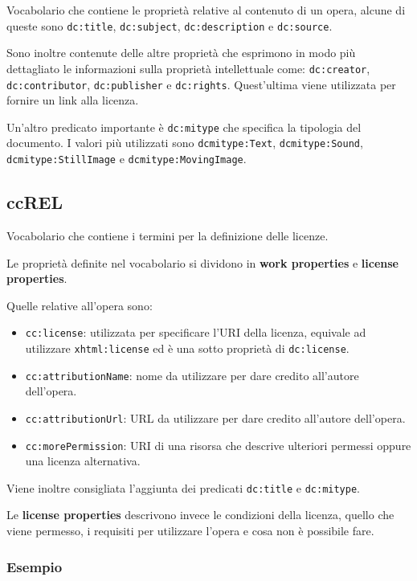 Vocabolario che contiene le proprietà relative al contenuto di un opera, alcune di queste sono \texttt{dc:title}, \texttt{dc:subject}, \texttt{dc:description} e \texttt{dc:source}.

Sono inoltre contenute delle altre proprietà che esprimono in modo più dettagliato le informazioni sulla proprietà intellettuale come: \texttt{dc:creator}, \texttt{dc:contributor}, \texttt{dc:publisher} e \texttt{dc:rights}. Quest'ultima viene utilizzata per fornire un link alla licenza.

Un'altro predicato importante è \texttt{dc:mitype} che specifica la tipologia del documento. I valori più utilizzati sono \texttt{dcmitype:Text}, \texttt{dcmitype:Sound}, \texttt{dcmitype:StillImage} e \texttt{dcmitype:MovingImage}.

\subsection{ccREL}

Vocabolario che contiene i termini per la definizione delle licenze.

Le proprietà definite nel vocabolario si dividono in \textbf{work properties} e \textbf{license properties}.

Quelle relative all'opera sono:

\begin{itemize}
	\item \texttt{cc:license}: utilizzata per specificare l'URI della licenza, equivale ad utilizzare \texttt{xhtml:license} ed è una sotto proprietà di \texttt{dc:license}.
	\item \texttt{cc:attributionName}: nome da utilizzare per dare credito all'autore dell'opera.
	\item \texttt{cc:attributionUrl}: URL da utilizzare per dare credito all'autore dell'opera.
	\item \texttt{cc:morePermission}: URI di una risorsa che descrive ulteriori permessi oppure una licenza alternativa.
\end{itemize}

Viene inoltre consigliata l'aggiunta dei predicati \texttt{dc:title} e \texttt{dc:mitype}.

Le \textbf{license properties} descrivono invece le condizioni della licenza, quello che viene permesso, i requisiti per utilizzare l'opera e cosa non è possibile fare.


\subsubsection{Esempio}

